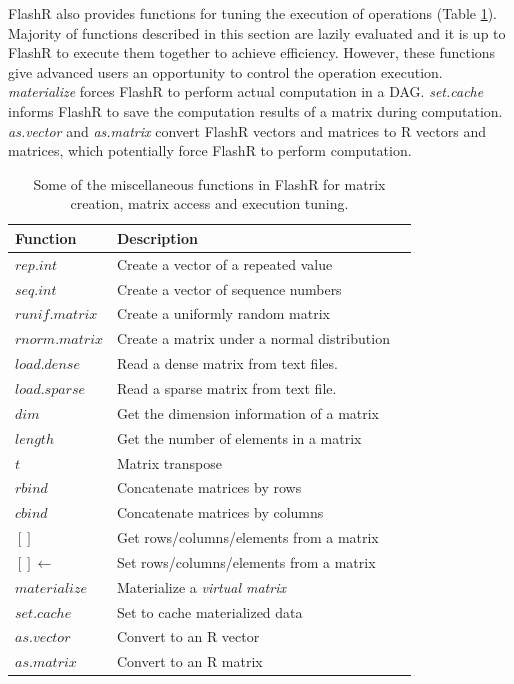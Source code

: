 FlashR also provides functions for tuning the execution of operations (Table
\ref{tbl:utility}).
Majority of functions described in this section are lazily evaluated and
it is up to FlashR to execute them together to achieve efficiency. However,
these functions give advanced users an opportunity to control the operation
execution. \textit{materialize} forces FlashR to perform actual computation
in a DAG. \textit{set.cache} informs FlashR to save the computation results
of a matrix during computation. \textit{as.vector} and \textit{as.matrix}
convert FlashR vectors and matrices to R vectors and matrices, which potentially
force FlashR to perform computation.

\begin{table}
\begin{center}
\caption{Some of the miscellaneous functions in FlashR for matrix creation,
	matrix access and execution tuning.}
\vspace{-10pt}
\footnotesize
\begin{tabular}{|l|l|l|}
\hline
Function & Description \\
\hline
$rep.int$ & Create a vector of a repeated value \\
$seq.int$ & Create a vector of sequence numbers \\
$runif.matrix$ & Create a uniformly random matrix  \\
$rnorm.matrix$ & Create a matrix under a normal distribution \\
\hline
$load.dense$ & Read a dense matrix from text files. \\
$load.sparse$ & Read a sparse matrix from text file. \\
\hline
$dim$ & Get the dimension information of a matrix\\
$length$ & Get the number of elements in a matrix\\
\hline
$t$ & Matrix transpose \\
$rbind$ & Concatenate matrices by rows \\
$cbind$ & Concatenate matrices by columns \\
$[]$ & Get rows/columns/elements from a matrix \\
$[]\gets$ & Set rows/columns/elements from a matrix \\
\hline
$materialize$ & Materialize a \textit{virtual matrix} \\
$set.cache$ & Set to cache materialized data \\
$as.vector$ & Convert to an R vector \\
$as.matrix$ & Convert to an R matrix \\
\hline
\end{tabular}
\normalsize
\label{tbl:utility}
\end{center}
\end{table}

